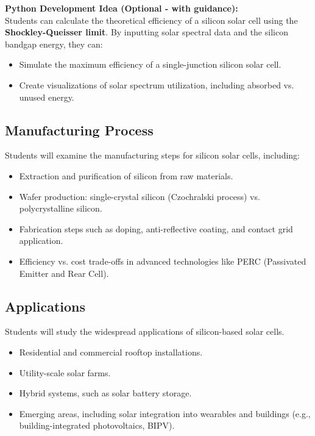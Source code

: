 \documentclass[11pt]{article}
\begin{document}
\textbf{Python Development Idea (Optional - with guidance):}  \\
Students can calculate the theoretical efficiency of a silicon solar cell using the \textbf{Shockley-Queisser limit}. By inputting solar spectral data and the silicon bandgap energy, they can:
\begin{itemize}
    \item Simulate the maximum efficiency of a single-junction silicon solar cell.
    \item Create visualizations of solar spectrum utilization, including absorbed vs. unused energy.
\end{itemize}

\subsection{Manufacturing Process}
Students will examine the manufacturing steps for silicon solar cells, including:
\begin{itemize}
    \item Extraction and purification of silicon from raw materials.
    \item Wafer production: single-crystal silicon (Czochralski process) vs. polycrystalline silicon.
    \item Fabrication steps such as doping, anti-reflective coating, and contact grid application.
    \item Efficiency vs. cost trade-offs in advanced technologies like PERC (Passivated Emitter and Rear Cell).
\end{itemize}

\subsection{Applications}
Students will study the widespread applications of silicon-based solar cells.
\begin{itemize}
    \item Residential and commercial rooftop installations.
    \item Utility-scale solar farms.
    \item Hybrid systems, such as solar battery storage.
    \item Emerging areas, including solar integration into wearables and buildings (e.g., building-integrated photovoltaics, BIPV).
\end{itemize}
\end{document}
